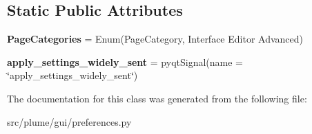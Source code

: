\subsection*{Static Public Attributes}
\begin{DoxyCompactItemize}
\item 
{\bfseries Page\+Categories} = Enum(\textquotesingle{}Page\+Category\textquotesingle{}, \textquotesingle{}Interface Editor Advanced\textquotesingle{})\hypertarget{classplume-creator_1_1src_1_1plume_1_1gui_1_1preferences_1_1_preferences_a32d9441f8cc4e969af6d0fc1da050f20}{}\label{classplume-creator_1_1src_1_1plume_1_1gui_1_1preferences_1_1_preferences_a32d9441f8cc4e969af6d0fc1da050f20}

\item 
{\bfseries apply\+\_\+settings\+\_\+widely\+\_\+sent} = pyqt\+Signal(name = \char`\"{}apply\+\_\+settings\+\_\+widely\+\_\+sent\char`\"{})\hypertarget{classplume-creator_1_1src_1_1plume_1_1gui_1_1preferences_1_1_preferences_a3d65647f8aea044a30f37a53f183b89c}{}\label{classplume-creator_1_1src_1_1plume_1_1gui_1_1preferences_1_1_preferences_a3d65647f8aea044a30f37a53f183b89c}

\end{DoxyCompactItemize}


The documentation for this class was generated from the following file\+:\begin{DoxyCompactItemize}
\item 
src/plume/gui/preferences.\+py\end{DoxyCompactItemize}
